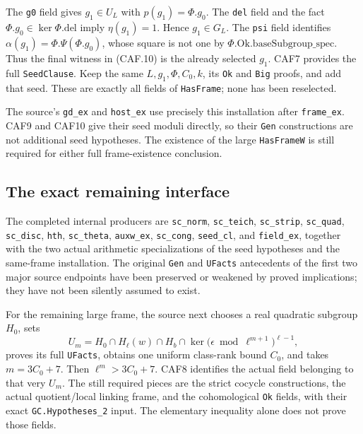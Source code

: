 The \texttt{g0} field gives \(g_1\in U_L\) with
\(p(g_1)=\Phi.g_0\).  The \texttt{del} field and the fact
\(\Phi.g_0\in\ker\Phi.\mathrm{del}\) imply
\(\eta(g_1)=1\).  Hence \(g_1\in G_L\).
The \texttt{psi} field identifies
\(\alpha(g_1)=\Phi.\Psi(\Phi.g_0)\), whose square is not one
by \(\Phi.\mathrm{Ok}.\mathrm{baseSubgroup\_spec}\).
Thus the final witness in (CAF.10) is the already selected \(g_1\).
CAF7 provides the full \texttt{SeedClause}.  Keep the same
\(L,g_1,\Phi,C_0,k\), its \texttt{Ok} and \texttt{Big} proofs,
and add that seed.  These are exactly all fields of
\texttt{HasFrame}; none has been reselected.

The source's \texttt{gd\_ex} and \texttt{host\_ex} use precisely
this installation after \texttt{frame\_ex}.  CAF9 and CAF10 give
their seed moduli directly, so their \texttt{Gen} constructions are
not additional seed hypotheses.  The existence of the large
\texttt{HasFrameW} is still required for either full frame-existence
conclusion.

\subsection{The exact remaining interface}

The completed internal producers are \texttt{sc\_norm},
\texttt{sc\_teich}, \texttt{sc\_strip}, \texttt{sc\_quad},
\texttt{sc\_disc}, \texttt{hth}, \texttt{sc\_theta},
\texttt{auxw\_ex}, \texttt{sc\_cong}, \texttt{seed\_cl}, and
\texttt{field\_ex}, together with the two actual arithmetic
specializations of the seed hypotheses and the same-frame
installation.  The original \texttt{Gen} and \texttt{UFacts}
antecedents of the first two major source endpoints have been
preserved or weakened by proved implications; they have not been
silently assumed to exist.

For the remaining large frame, the source next chooses a real
quadratic subgroup \(H_0\), sets
\[
 U_m=H_0\cap H_\ell(w)\cap H_b\cap
          \ker\bigl(\epsilon\bmod\ell^{m+1}\bigr)^{\ell-1},
 \tag{CAF.16}
\]
proves its full \texttt{UFacts}, obtains one uniform class-rank
bound \(C_0\), and takes \(m=3C_0+7\).  Then
\(\ell^m>3C_0+7\).  CAF8 identifies the actual field belonging
to that very \(U_m\).  The still required pieces are the strict
cocycle constructions, the actual quotient/local linking frame,
and the cohomological \texttt{Ok} fields, with their exact
\texttt{GC.Hypotheses\_2} input.  The elementary inequality alone
does not prove those fields.

